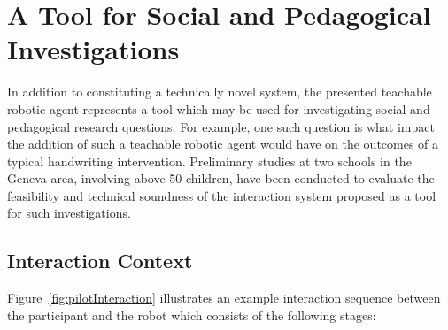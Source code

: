\documentclass{sig-alternate}
\begin{document}


\section{A Tool for Social and Pedagogical Investigations} \label{sec:experiment}
\label{sec4}

In addition to constituting a technically novel system, the presented teachable
robotic agent represents a tool which may be used for investigating social and
pedagogical research questions. For example, one such question is what impact the addition of
such a teachable robotic agent would have on the outcomes of a typical
handwriting intervention. 
Preliminary studies at two schools in the Geneva area, involving above 50 children, 
have been conducted to evaluate the feasibility and technical soundness of the 
interaction system proposed as a tool for such investigations.

\subsection{Interaction Context}

Figure~\ref{fig:pilotInteraction}
illustrates an example interaction sequence between the participant and the
robot which consists of the following stages:
\end{document}
